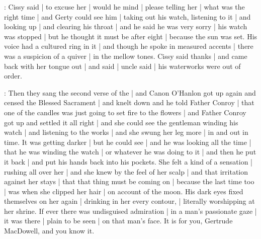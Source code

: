 :
Cissy said |
to excuse her |
would he mind |
please telling her |
what was the right time |
and Gerty could see him |
taking out his watch,
listening to it |
and looking up |
and clearing his throat |
and he said he was very sorry |
his watch was stopped |
but he thought it must be after eight |
because the sun was set.
His voice had a cultured ring in it |
and though he spoke in measured accents |
there was a suspicion of a quiver |
in the mellow tones.
Cissy said thanks |
and came back with her tongue out |%
and said |
uncle said |
his waterworks were out of order.

:
Then they sang the second verse of the  |
and Canon O'Hanlon got up again
and censed the Blessed Sacrament |
and knelt down
and he told Father Conroy |
that one of the candles
was just going to set fire to the flowers |
and Father Conroy got up
and settled it all right |
and she could see the gentleman
winding his watch |
and listening to the works |
and she swung her leg more |
in and out in time.
It was getting darker |
but he could see |
and he was looking all the time |
that he was winding the watch |
or whatever he was doing to it |
and then he put it back |
and put his hands back into his pockets.%
She felt a kind of a sensation |
rushing all over her |
and she knew by the feel of her scalp |
and that irritation against her stays |
that that thing must be coming on |
because the last time too |
was when she clipped her hair |
on account of the moon.
His dark eyes fixed themselves on her again |
drinking in her every contour, |
literally worshipping at her shrine.
If ever there was undisguised admiration |
in a man's passionate gaze |
it was there |
plain to be seen |
on that man's face.
It is for you,
Gertrude MacDowell,
and you know it.

